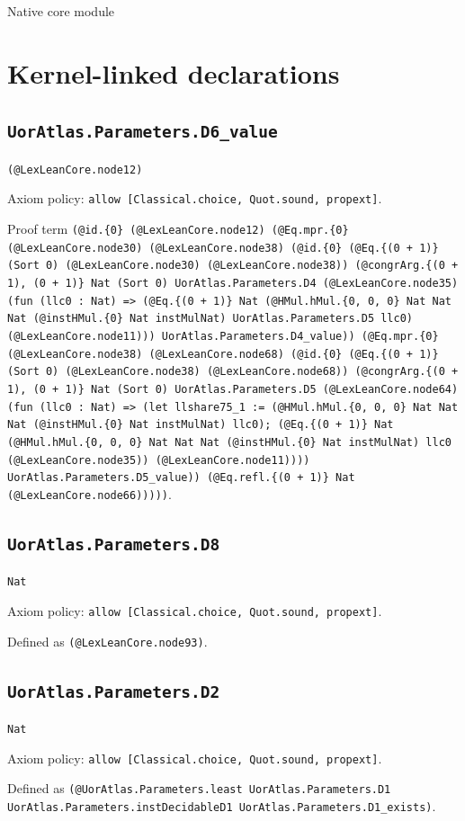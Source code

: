 \documentclass[11pt]{article}
\begin{document}
\begin{center}{\LARGE Native core module}\end{center}
\section*{Kernel-linked declarations}
\subsection*{\texttt{UorAtlas.Parameters.D6\_value}}
\noindent\texttt{(@LexLeanCore.node12)}\par
\noindent Axiom policy: \texttt{allow [Classical.choice, Quot.sound, propext]}.\par
\noindent Proof term \texttt{(@id.\{0\} (@LexLeanCore.node12) (@Eq.mpr.\{0\} (@LexLeanCore.node30) (@LexLeanCore.node38) (@id.\{0\} (@Eq.\{(0 + 1)\} (Sort 0) (@LexLeanCore.node30) (@LexLeanCore.node38)) (@congrArg.\{(0 + 1), (0 + 1)\} Nat (Sort 0) UorAtlas.Parameters.D4 (@LexLeanCore.node35) (fun (llc0 : Nat) => (@Eq.\{(0 + 1)\} Nat (@HMul.hMul.\{0, 0, 0\} Nat Nat Nat (@instHMul.\{0\} Nat instMulNat) UorAtlas.Parameters.D5 llc0) (@LexLeanCore.node11))) UorAtlas.Parameters.D4\_value)) (@Eq.mpr.\{0\} (@LexLeanCore.node38) (@LexLeanCore.node68) (@id.\{0\} (@Eq.\{(0 + 1)\} (Sort 0) (@LexLeanCore.node38) (@LexLeanCore.node68)) (@congrArg.\{(0 + 1), (0 + 1)\} Nat (Sort 0) UorAtlas.Parameters.D5 (@LexLeanCore.node64) (fun (llc0 : Nat) => (let llshare75\_1 := (@HMul.hMul.\{0, 0, 0\} Nat Nat Nat (@instHMul.\{0\} Nat instMulNat) llc0); (@Eq.\{(0 + 1)\} Nat (@HMul.hMul.\{0, 0, 0\} Nat Nat Nat (@instHMul.\{0\} Nat instMulNat) llc0 (@LexLeanCore.node35)) (@LexLeanCore.node11)))) UorAtlas.Parameters.D5\_value)) (@Eq.refl.\{(0 + 1)\} Nat (@LexLeanCore.node66)))))}.\par
\subsection*{\texttt{UorAtlas.Parameters.D8}}
\noindent\texttt{Nat}\par
\noindent Axiom policy: \texttt{allow [Classical.choice, Quot.sound, propext]}.\par
\noindent Defined as \texttt{(@LexLeanCore.node93)}.\par
\subsection*{\texttt{UorAtlas.Parameters.D2}}
\noindent\texttt{Nat}\par
\noindent Axiom policy: \texttt{allow [Classical.choice, Quot.sound, propext]}.\par
\noindent Defined as \texttt{(@UorAtlas.Parameters.least UorAtlas.Parameters.D1 UorAtlas.Parameters.instDecidableD1 UorAtlas.Parameters.D1\_exists)}.\par
\end{document}
